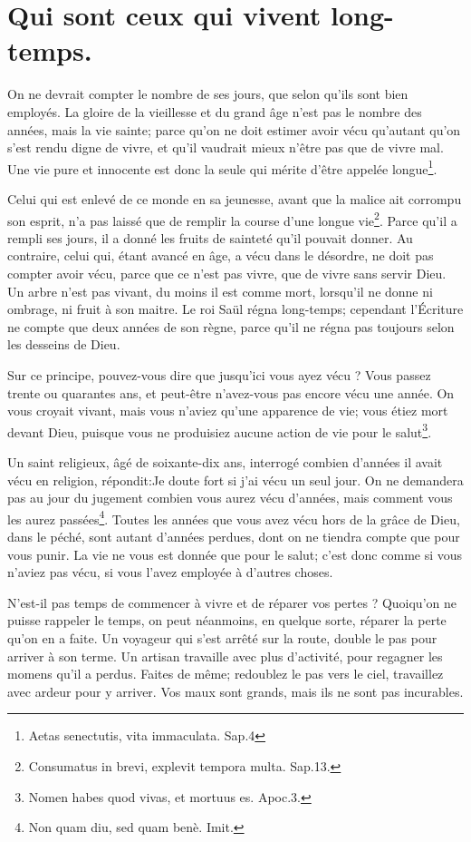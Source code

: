 \documentclass[instructions.tex]{subfiles}
\begin{document}
 
\chapter{Qui sont ceux qui vivent long-temps.}
 

\primo On ne devrait compter le nombre de ses jours, que selon qu'ils sont bien employés. La gloire de la vieillesse et du grand âge n'est pas le nombre des années, mais la vie sainte; parce qu'on ne doit estimer avoir vécu qu'autant qu'on s'est rendu digne de vivre, et qu'il vaudrait mieux n'être pas que de vivre mal. Une vie pure et innocente est donc la seule qui mérite d'être appelée longue\footnote{Aetas senectutis, vita immaculata. Sap.4}. 

Celui qui est enlevé de ce monde en sa jeunesse, avant que la malice ait corrompu son esprit, n'a pas laissé que de remplir la course d'une longue vie\footnote{Consumatus in brevi, explevit tempora multa. Sap.13.}. Parce qu'il a rempli ses jours, il a donné les fruits de sainteté qu'il pouvait donner. Au contraire, celui qui, étant avancé en âge, a vécu dans le désordre, ne doit pas compter avoir vécu, parce que ce n'est pas vivre, que de vivre sans servir Dieu. Un arbre n'est pas vivant, du moins il est comme mort, lorsqu'il ne donne ni ombrage, ni fruit à son maitre. Le roi Saül régna long-temps; cependant l'Écriture ne compte que deux années de son règne, parce qu'il ne régna pas toujours selon les desseins de Dieu. 

Sur ce principe, pouvez-vous dire que jusqu'ici vous ayez vécu ? Vous passez trente ou quarantes ans, et peut-être n'avez-vous pas encore vécu une année. On vous croyait vivant, mais vous n'aviez qu'une apparence de vie; vous étiez mort devant Dieu, puisque vous ne produisiez aucune action de vie pour le salut\footnote{Nomen habes quod vivas, et mortuus es. Apoc.3.}. 

Un saint religieux, âgé de soixante-dix ans, interrogé combien d'années il avait vécu en religion, répondit:\og Je doute fort si j'ai vécu un seul jour\fg. On ne demandera pas au jour du jugement combien vous aurez vécu d'années, mais comment vous les aurez passées\footnote{Non quam diu, sed quam benè. Imit.}. Toutes les années que vous avez vécu hors de la grâce de Dieu, dans le péché, sont autant d'années perdues, dont on ne tiendra compte que pour vous punir. La vie ne vous est donnée que pour le salut; c'est donc comme si vous n'aviez pas vécu, si vous l'avez employée à d'autres choses. 

\secundo N'est-il pas temps de commencer à vivre et de réparer vos pertes ? Quoiqu'on ne puisse rappeler le temps, on peut néanmoins, en quelque sorte, réparer la perte qu'on en a faite. Un voyageur qui s'est arrêté sur la route, double le pas pour arriver à son terme. Un artisan travaille avec plus d'activité, pour regagner les momens qu'il a perdus. Faites de même; redoublez le pas vers le ciel, travaillez avec ardeur pour y arriver. Vos maux sont grands, mais ils ne sont pas incurables. 
\end{document}

